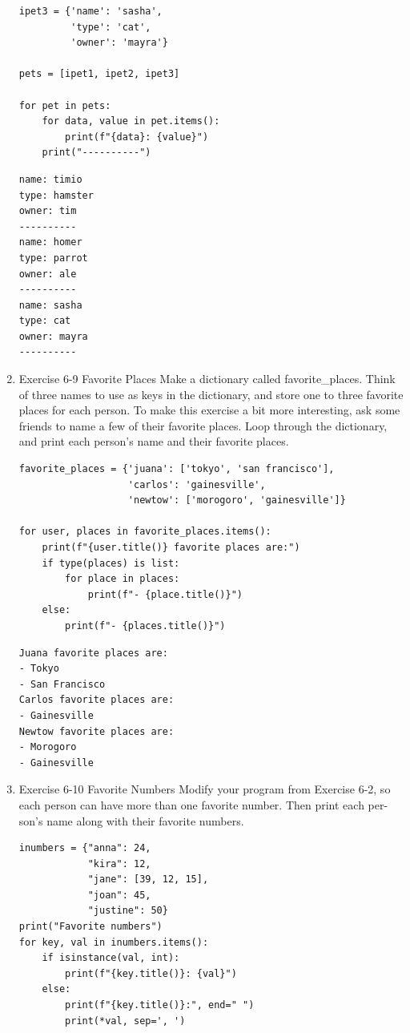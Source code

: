 \documentclass[10pt]{book}
\begin{document}
\begin{enumerate}
\begin{verbatim}
ipet3 = {'name': 'sasha',
         'type': 'cat',
         'owner': 'mayra'}

pets = [ipet1, ipet2, ipet3]

for pet in pets:
    for data, value in pet.items():
        print(f"{data}: {value}")
    print("----------")
\end{verbatim}

\label{org8a24155}
\begin{verbatim}
name: timio
type: hamster
owner: tim
----------
name: homer
type: parrot
owner: ale
----------
name: sasha
type: cat
owner: mayra
----------
\end{verbatim}
\item Exercise 6-9 Favorite Places
\label{sec:orgac0c3bb}
Make a dictionary called favorite\_places. Think of three names to use as keys in the dictionary, and store one to three favorite places for each person. To make this exercise a bit more interesting, ask some friends to name a few of their favorite places. Loop through the dictionary, and print each person’s name and their favorite places.
\begin{verbatim}
favorite_places = {'juana': ['tokyo', 'san francisco'],
                   'carlos': 'gainesville',
                   'newtow': ['morogoro', 'gainesville']}

for user, places in favorite_places.items():
    print(f"{user.title()} favorite places are:")
    if type(places) is list:
        for place in places:
            print(f"- {place.title()}")
    else:
        print(f"- {places.title()}")
\end{verbatim}

\label{org164542f}
\begin{verbatim}
Juana favorite places are:
- Tokyo
- San Francisco
Carlos favorite places are:
- Gainesville
Newtow favorite places are:
- Morogoro
- Gainesville
\end{verbatim}
\item Exercise 6-10 Favorite Numbers
\label{sec:orgce42686}
Modify your program from Exercise 6-2,  so each person can have more than one favorite number. Then print each per- son’s name along with their favorite numbers.
\begin{verbatim}
inumbers = {"anna": 24,
            "kira": 12,
            "jane": [39, 12, 15],
            "joan": 45,
            "justine": 50}
print("Favorite numbers")
for key, val in inumbers.items():
    if isinstance(val, int):
        print(f"{key.title()}: {val}")
    else:
        print(f"{key.title()}:", end=" ")
        print(*val, sep=', ')
\end{verbatim}


\end{enumerate}
\end{document}
